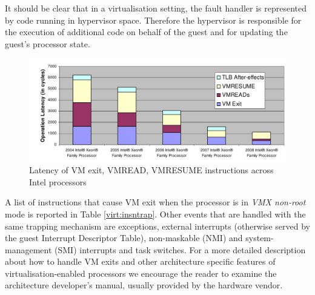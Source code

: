 It should be clear that in a virtualisation setting, the fault handler is represented by code running in hypervisor space. Therefore the hypervisor is responsible for the execution of additional code on behalf of the guest and for updating the guest's processor state.

\begin{figure}[htbp] 
\begin{center}
\includegraphics[scale=0.27]{images/intel_latency}
\caption{{Latency of VM exit, VMREAD, VMRESUME instructions across Intel processors}}
\label{intel_latency}
\end{center}
\end{figure}


A list of instructions that cause VM exit when the processor is in \emph{VMX non-root} mode is reported in Table \ref{virt:insntrap}. Other events that are handled with the same trapping mechanism are exceptions, external interrupts (otherwise served by the guest Interrupt Descriptor Table), non-maskable (NMI) and system-management (SMI) interrupts and task switches. For a more detailed description about how to handle VM exits and other architecture specific features of virtualisation-enabled processors we encourage the reader to examine the architecture developer's manual, usually provided by the hardware vendor.

